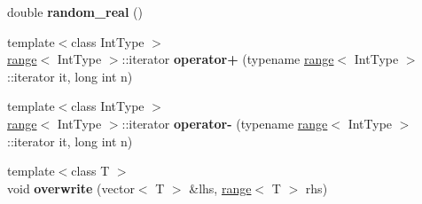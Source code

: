 \begin{DoxyCompactItemize}
\item 
\hypertarget{namespacedscr_a6d213450a8792dd5a5cec9f0ea719c81}{double {\bfseries random\-\_\-real} ()}\label{namespacedscr_a6d213450a8792dd5a5cec9f0ea719c81}

\item 
\hypertarget{namespacedscr_a6c80df2cf9f85293d56c53822ae5d320}{{\footnotesize template$<$class Int\-Type $>$ }\\\hyperlink{classdscr_1_1range}{range}$<$ Int\-Type $>$\-::iterator {\bfseries operator+} (typename \hyperlink{classdscr_1_1range}{range}$<$ Int\-Type $>$\-::iterator it, long int n)}\label{namespacedscr_a6c80df2cf9f85293d56c53822ae5d320}

\item 
\hypertarget{namespacedscr_a0a852f8cf5bdda064cf23ff9b9465fd0}{{\footnotesize template$<$class Int\-Type $>$ }\\\hyperlink{classdscr_1_1range}{range}$<$ Int\-Type $>$\-::iterator {\bfseries operator-\/} (typename \hyperlink{classdscr_1_1range}{range}$<$ Int\-Type $>$\-::iterator it, long int n)}\label{namespacedscr_a0a852f8cf5bdda064cf23ff9b9465fd0}

\item 
\hypertarget{namespacedscr_add7fdb91f0c50ffff676219b2d94334f}{{\footnotesize template$<$class T $>$ }\\void {\bfseries overwrite} (vector$<$ T $>$ \&lhs, \hyperlink{classdscr_1_1range}{range}$<$ T $>$ rhs)}\label{namespacedscr_add7fdb91f0c50ffff676219b2d94334f}


\end{DoxyCompactItemize}
